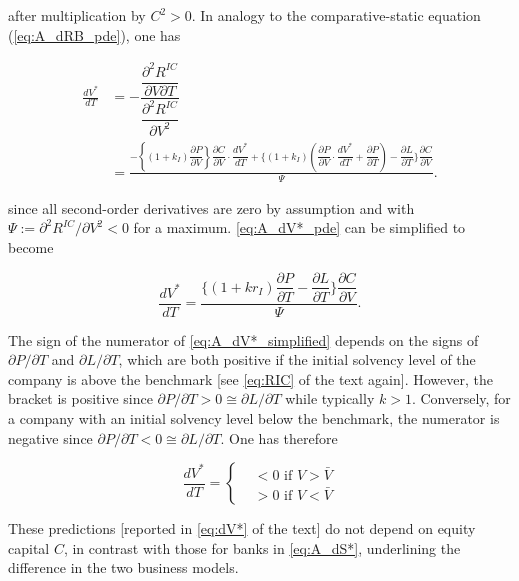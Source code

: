 \noindent after multiplication by $C^2>0$. In analogy to the comparative-static equation (\autoref{eq:A_dRB_pde}), one has 

\begin{align}
\frac{dV^*}{dT} &= -\dfrac{\dfrac{\partial^2 R^{IC}}{\partial V \partial T}}{\dfrac{\partial^2 R^{IC}}{\partial V^2}} \nonumber \\[10pt]
&= \frac{
    -\left\{ (1 + k_I) \dfrac{\partial P}{\partial V} \right\} \dfrac{\partial C}{\partial V} \cdot \dfrac{dV^*}{dT} 
    + \bigg\{ (1 + k_I) \left( \dfrac{\partial P}{\partial V}\cdot \dfrac{dV^*}{dT} + \dfrac{\partial P}{\partial T} \right) 
    - \dfrac{\partial L}{\partial T} \bigg\} \dfrac{\partial C}{\partial V}
}{\Psi}. \label{eq:A_dV*_pde}
\end{align}


\noindent since all second-order derivatives are zero by assumption and with $\Psi := \partial^2 R^{IC} / \partial V^2 <0$ for a maximum. \autoref{eq:A_dV*_pde} can be simplified to become 

\begin{equation}
    \frac{dV^*}{dT}=\frac{\bigg\{ (1+kr_I)\dfrac{\partial P}{\partial T}-\dfrac{\partial L}{\partial T}\bigg\}\dfrac{\partial C}{\partial V}}{\Psi} .\label{eq:A_dV*_simplified}
\end{equation}

The sign of the numerator of \autoref{eq:A_dV*_simplified} depends on the signs of $\partial P / \partial T$ and $\partial L / \partial T$, which are both positive if the initial solvency level of the company is above the benchmark [see \autoref{eq:RIC} of the text again]. However, the bracket is positive since $\partial P / \partial T > 0 \cong \partial L / \partial T$ while typically $k>1$. Conversely, for a company with an initial solvency level below the benchmark, the numerator is negative since $\partial P / \partial T < 0 \cong \partial L / \partial T$. One has therefore

\begin{equation}
    \frac{dV^*}{dT}= \begin{cases}
        &< 0 \text{ if } V>\bar{V} \\
        &> 0 \text{ if } V<\bar{V}
    \end{cases} \label{eq:A_dV*}
\end{equation}

These predictions [reported in \autoref{eq:dV*} of the text] do not depend on equity capital $C$, in contrast with those for banks in \autoref{eq:A_dS*}, underlining the difference in the two business models.
